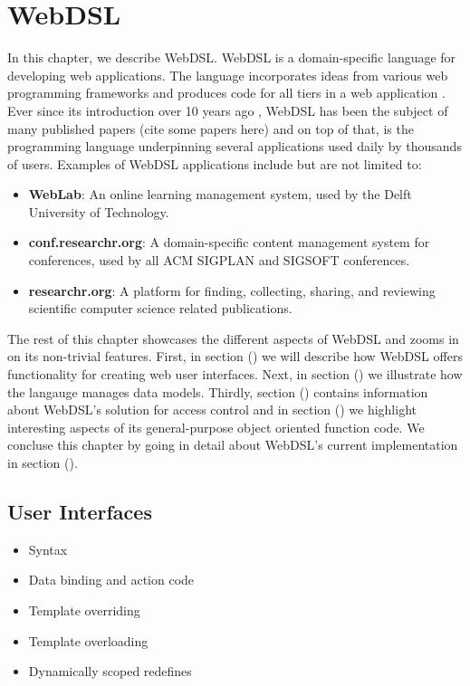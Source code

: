 
\chapter{\label{chap:webdsl}WebDSL}

  In this chapter, we describe WebDSL. WebDSL is a domain-specific language for developing web applications. The language incorporates ideas from various web programming frameworks and produces code for all tiers in a web application \autocite{Groenewegen2020}. Ever since its introduction over 10 years ago \autocite{Visser07}, WebDSL has been the subject of many published papers (cite some papers here) and on top of that, is the programming language underpinning several applications used daily by thousands of users. Examples of WebDSL applications include but are not limited to:
  \begin{itemize}
    \item \textbf{WebLab}: An online learning management system, used by the Delft University of Technology.
    \item \textbf{conf.researchr.org}: A domain-specific content management system for conferences, used by all ACM SIGPLAN and SIGSOFT conferences.
    \item \textbf{researchr.org}: A platform for finding, collecting, sharing, and reviewing scientific computer science related publications.
  \end{itemize}

  The rest of this chapter showcases the different aspects of WebDSL and zooms in on its non-trivial features. First, in section () we will describe how WebDSL offers functionality for creating web user interfaces. Next, in section () we illustrate how the langauge manages data models. Thirdly, section () contains information about WebDSL's solution for access control and in section () we highlight interesting aspects of its general-purpose object oriented function code. We concluse this chapter by going in detail about WebDSL's current implementation in section ().

  \section{User Interfaces}

    \begin{itemize}
      \item Syntax
      \item Data binding and action code
      \item Template overriding
      \item Template overloading
      \item Dynamically scoped redefines
    \end{itemize}

